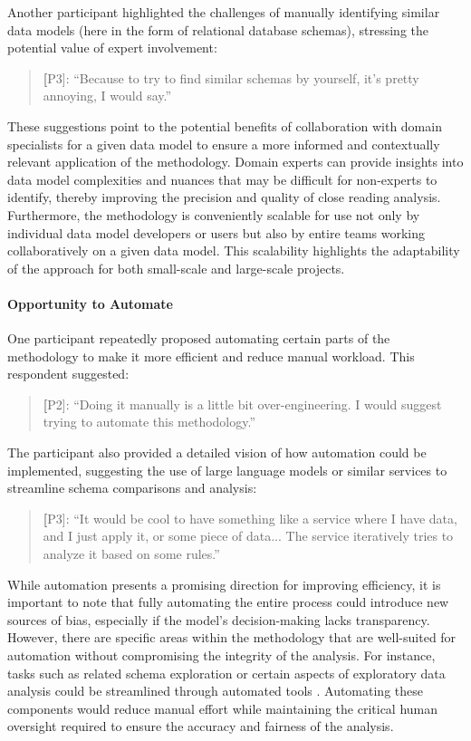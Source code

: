 Another participant highlighted the challenges of manually identifying similar data models (here in the form of relational database schemas), stressing the potential value of expert involvement:

\begin{quote} \textbf[P3]: ``Because to try to find similar schemas by yourself, it's pretty annoying, I would say.'' \end{quote}

These suggestions point to the potential benefits of collaboration with domain specialists for a given data model to ensure a more informed and contextually relevant application of the methodology. Domain experts can provide insights into data model complexities and nuances that may be difficult for non-experts to identify, thereby improving the precision and quality of close reading analysis. Furthermore, the methodology is conveniently scalable for use not only by individual data model developers or users but also by entire teams working collaboratively on a given data model. This scalability highlights the adaptability of the approach for both small-scale and large-scale projects.

\paragraph{Opportunity to Automate} One participant repeatedly proposed automating certain parts of the methodology to make it more efficient and reduce manual workload. This respondent suggested:

\begin{quote} \textbf[P2]: ``Doing it manually is a little bit over-engineering. I would suggest trying to automate this methodology.'' \end{quote}

The participant also provided a detailed vision of how automation could be implemented, suggesting the use of large language models or similar services to streamline schema comparisons and analysis:

\begin{quote} \textbf[P3]: ``It would be cool to have something like a service where I have data, and I just apply it, or some piece of data... The service iteratively tries to analyze it based on some rules.'' \end{quote}

While automation presents a promising direction for improving efficiency, it is important to note that fully automating the entire process could introduce new sources of bias, especially if the model's decision-making lacks transparency. However, there are specific areas within the methodology that are well-suited for automation without compromising the integrity of the analysis. For instance, tasks such as related schema exploration or certain aspects of exploratory data analysis could be streamlined through automated tools \cite{abedjan,downey}. Automating these components would reduce manual effort while maintaining the critical human oversight required to ensure the accuracy and fairness of the analysis.

